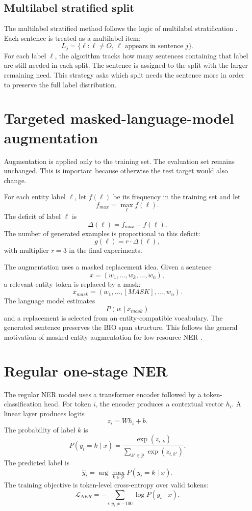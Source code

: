 \documentclass[12pt,a4paper]{report}
\begin{document}
\subsection{Multilabel stratified split}
The multilabel stratified method follows the logic of multilabel stratification \citep{sechidis2011,szymanski2017}. Each sentence is treated as a multilabel item:
\[
L_j=\{\ell:\ell\neq O,\,\ell\text{ appears in sentence }j\}.
\]
For each label $\ell$, the algorithm tracks how many sentences containing that label are still needed in each split. The sentence is assigned to the split with the larger remaining need. This strategy asks which split needs the sentence more in order to preserve the full label distribution.

\section{Targeted masked-language-model augmentation}
Augmentation is applied only to the training set. The evaluation set remains unchanged. This is important because otherwise the test target would also change.

For each entity label $\ell$, let $f(\ell)$ be its frequency in the training set and let
\[
f_{max}=\max_{\ell} f(\ell).
\]
The deficit of label $\ell$ is
\[
\Delta(\ell)=f_{max}-f(\ell).
\]
The number of generated examples is proportional to this deficit:
\[
g(\ell)=r\cdot \Delta(\ell),
\]
with multiplier $r=3$ in the final experiments.

The augmentation uses a masked replacement idea. Given a sentence
\[
x=(w_1,\ldots,w_k,\ldots,w_n),
\]
a relevant entity token is replaced by a mask:
\[
x_{mask}=(w_1,\ldots,[MASK],\ldots,w_n).
\]
The language model estimates
\[
P(w\mid x_{mask})
\]
and a replacement is selected from an entity-compatible vocabulary. The generated sentence preserves the BIO span structure. This follows the general motivation of masked entity augmentation for low-resource NER \citep{zhou2022melm}.

\section{Regular one-stage NER}
The regular NER model uses a transformer encoder followed by a token-classification head. For token $i$, the encoder produces a contextual vector $h_i$. A linear layer produces logits
\[
z_i=Wh_i+b.
\]
The probability of label $k$ is
\[
P(y_i=k\mid x)=\frac{\exp(z_{i,k})}{\sum_{k'\in\mathcal{Y}}\exp(z_{i,k'})}.
\]
The predicted label is
\[
\hat{y}_i=\arg\max_{k\in\mathcal{Y}}P(y_i=k\mid x).
\]
The training objective is token-level cross-entropy over valid tokens:
\[
\mathcal{L}_{NER}=-\sum_{i:y_i\neq -100}\log P(y_i\mid x).
\]
\end{document}
